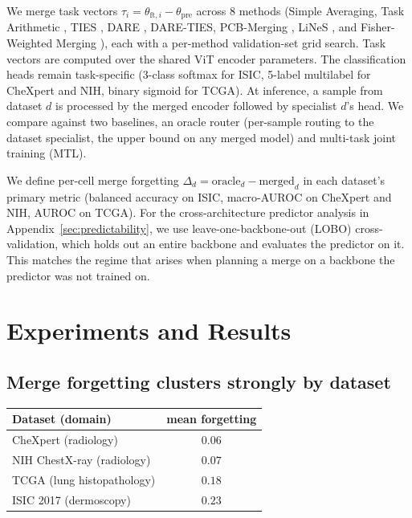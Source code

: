 \documentclass{article}
\begin{document}
We merge task vectors $\tau_i = \theta_{\text{ft},i} - \theta_{\text{pre}}$ across 8 methods (Simple Averaging, Task Arithmetic \cite{ilharco2023editing}, TIES \cite{yadav2023ties}, DARE \cite{yu2024language}, DARE-TIES, PCB-Merging \cite{du2024parametercompetitionbalancingmodel}, LiNeS \cite{wang2025linesposttraininglayerscaling}, and Fisher-Weighted Merging \cite{matena2022mergingmodelsfisherweightedaveraging}), each with a per-method validation-set grid search. Task vectors are computed over the shared ViT encoder parameters. The classification heads remain task-specific (3-class softmax for ISIC, 5-label multilabel for CheXpert and NIH, binary sigmoid for TCGA). At inference, a sample from dataset $d$ is processed by the merged encoder followed by specialist $d$'s head. We compare against two baselines, an oracle router (per-sample routing to the dataset specialist, the upper bound on any merged model) and multi-task joint training (MTL).

We define per-cell merge forgetting $\Delta_d = \text{oracle}_d - \text{merged}_d$ in each dataset's primary metric (balanced accuracy on ISIC, macro-AUROC on CheXpert and NIH, AUROC on TCGA). For the cross-architecture predictor analysis in Appendix~\ref{sec:predictability}, we use leave-one-backbone-out (LOBO) cross-validation, which holds out an entire backbone and evaluates the predictor on it. This matches the regime that arises when planning a merge on a backbone the predictor was not trained on.

\section{Experiments and Results}

\subsection{Merge forgetting clusters strongly by dataset}
\label{sec:dataset-clusters}

\begin{center}
\small
\begin{tabular}{lc}
\toprule
Dataset (domain) & mean forgetting \\
\midrule
CheXpert (radiology)       & $0.06$ \\
NIH ChestX-ray (radiology)    & $0.07$ \\
TCGA (lung histopathology)    & $0.18$ \\
ISIC 2017 (dermoscopy)      & $0.23$ \\
\bottomrule
\end{tabular}
\end{center}
\end{document}
